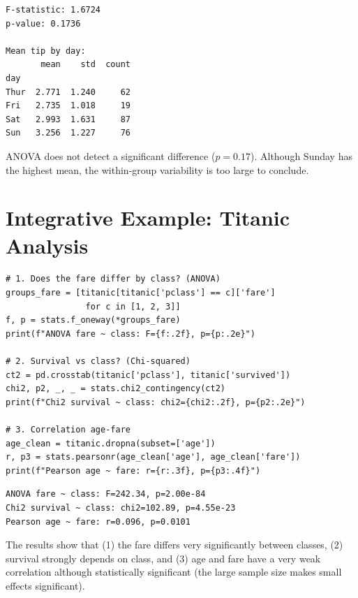 \begin{codeoutput}
\begin{verbatim}
F-statistic: 1.6724
p-value: 0.1736

Mean tip by day:
       mean    std  count
day
Thur  2.771  1.240     62
Fri   2.735  1.018     19
Sat   2.993  1.631     87
Sun   3.256  1.227     76

\end{verbatim}
\end{codeoutput}

\begin{remark}
ANOVA does not detect a significant difference ($p = 0.17$). Although Sunday has the highest mean, the within-group variability is too large to conclude.
\end{remark}

\section{Integrative Example: Titanic Analysis}

\begin{codeblock}[title=\textbf{Python}]
\begin{verbatim}
# 1. Does the fare differ by class? (ANOVA)
groups_fare = [titanic[titanic['pclass'] == c]['fare']
                for c in [1, 2, 3]]
f, p = stats.f_oneway(*groups_fare)
print(f"ANOVA fare ~ class: F={f:.2f}, p={p:.2e}")

# 2. Survival vs class? (Chi-squared)
ct2 = pd.crosstab(titanic['pclass'], titanic['survived'])
chi2, p2, _, _ = stats.chi2_contingency(ct2)
print(f"Chi2 survival ~ class: chi2={chi2:.2f}, p={p2:.2e}")

# 3. Correlation age-fare
age_clean = titanic.dropna(subset=['age'])
r, p3 = stats.pearsonr(age_clean['age'], age_clean['fare'])
print(f"Pearson age ~ fare: r={r:.3f}, p={p3:.4f}")
\end{verbatim}
\end{codeblock}

\begin{codeoutput}
\begin{verbatim}
ANOVA fare ~ class: F=242.34, p=2.00e-84
Chi2 survival ~ class: chi2=102.89, p=4.55e-23
Pearson age ~ fare: r=0.096, p=0.0101
\end{verbatim}
\end{codeoutput}

\begin{proposition}
The results show that (1) the fare differs very significantly between classes, (2) survival strongly depends on class, and (3) age and fare have a very weak correlation although statistically significant (the large sample size makes small effects significant).
\end{proposition}

